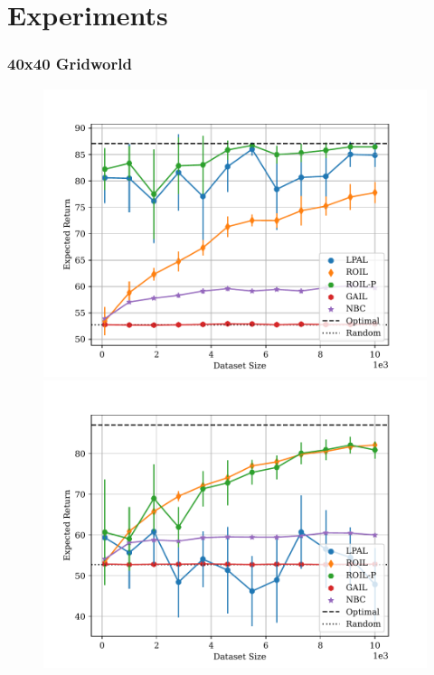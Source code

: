 \documentclass{beamer}
\begin{document}
\section*{Experiments}

\begin{frame}
\frametitle{40x40 Gridworld}

\begin{figure}
  \begin{center}
  \begin{minipage}{0.46\linewidth}
    \centering
    \includegraphics[width=\linewidth]{plots/returns/40x40_gridworld_on_policy_returns.pdf}
  \end{minipage}
  \hspace{0.05\linewidth}
  \begin{minipage}{0.46\linewidth}
    \centering
    \includegraphics[width=\linewidth]{plots/returns/40x40_gridworld_off_policy_returns.pdf}
  \end{minipage}
  \end{center}
\end{figure}

\end{frame}
\end{document}
